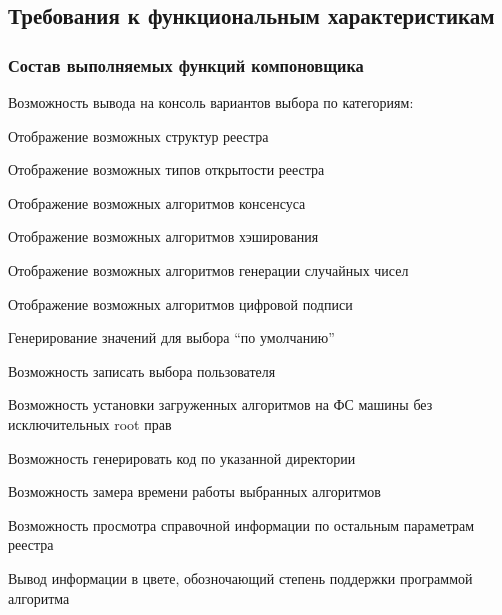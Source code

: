 \subsection{Требования к функциональным характеристикам}

\subsubsection{Состав выполняемых функций компоновщика}
\begin{my_enumerate}
    \item Возможность вывода на консоль вариантов выбора по категориям:
        \begin{my_enumerate}
                \item Отображение возможных структур реестра
                \item Отображение возможных типов открытости реестра
                \item Отображение возможных алгоритмов консенсуса
                \item Отображение возможных алгоритмов хэширования
                \item Отображение возможных алгоритмов генерации случайных чисел
                \item Отображение возможных алгоритмов цифровой подписи
        \end{my_enumerate}
    \item Генерирование значений для выбора ``по умолчанию''
    \item Возможность записать выбора пользователя
    \item Возможность установки загруженных алгоритмов на ФС машины без исключительных root прав
    \item Возможность генерировать код по указанной директории
    \item Возможность замера времени работы выбранных алгоритмов
    \item Возможность просмотра справочной информации по остальным параметрам реестра
    \item Вывод информации в цвете, обозночающий степень поддержки программой алгоритма
\end{my_enumerate}

